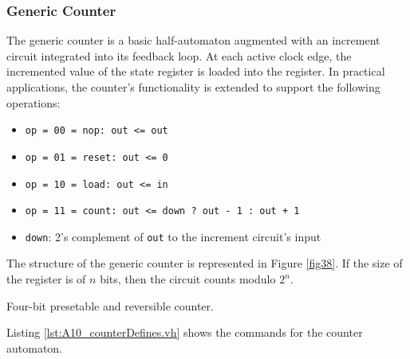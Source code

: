 \subsubsection{Generic Counter}
The generic counter is a basic half-automaton augmented with an increment circuit integrated into its feedback loop. At each active clock edge, the incremented value of the state register is loaded into the register. In practical applications, the counter's functionality is extended to support the following operations:


\begin{itemize}
    \item {\tt op = 00 = nop: out <= out}
    \item {\tt op = 01 = reset: out <= 0}
    \item {\tt op = 10 = load: out <= in}
    \item {\tt op = 11 = count: out <= down ? out - 1 : out + 1}
    \item {\tt down}: 2's complement of {\tt out} to the increment circuit's input
\end{itemize}

The structure of the generic counter is represented in Figure \ref{fig38}. If the size of the register is of $n$ bits, then the circuit counts modulo $2^n$.

\begin{exemplu}
Four-bit presetable and reversible counter.
{\em 
{}
}

Listing \ref{lst:A10_counterDefines.vh} shows the commands for the counter automaton.
\end{exemplu}
 


